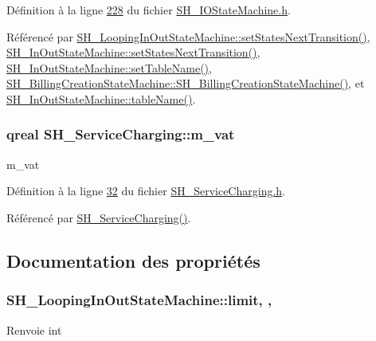 Définition à la ligne \hyperlink{SH__IOStateMachine_8h_source_l00228}{228} du fichier \hyperlink{SH__IOStateMachine_8h_source}{S\-H\-\_\-\-I\-O\-State\-Machine.\-h}.



Référencé par \hyperlink{classSH__LoopingInOutStateMachine_a0ee122553641721012f3710e71cce234}{S\-H\-\_\-\-Looping\-In\-Out\-State\-Machine\-::set\-States\-Next\-Transition()}, \hyperlink{classSH__InOutStateMachine_a70d6d81c0a8d4afd6aab0a7239edc237}{S\-H\-\_\-\-In\-Out\-State\-Machine\-::set\-States\-Next\-Transition()}, \hyperlink{classSH__InOutStateMachine_a95db31a7e7f31f36a8737adc739ab08c}{S\-H\-\_\-\-In\-Out\-State\-Machine\-::set\-Table\-Name()}, \hyperlink{classSH__BillingCreationStateMachine_ad62b77fa4aeafe200056ff3974562f83}{S\-H\-\_\-\-Billing\-Creation\-State\-Machine\-::\-S\-H\-\_\-\-Billing\-Creation\-State\-Machine()}, et \hyperlink{classSH__InOutStateMachine_a4288a6c86ddf83effefff886675591c9}{S\-H\-\_\-\-In\-Out\-State\-Machine\-::table\-Name()}.

\hypertarget{classSH__ServiceCharging_ae2fa75c56883dc4af6b0bbcbb86d0861}{
\subsubsection[{m\-\_\-vat}]{\setlength{\rightskip}{0pt plus 5cm}qreal S\-H\-\_\-\-Service\-Charging\-::m\-\_\-vat\hspace{0.3cm}{\ttfamily [private]}}}\label{classSH__ServiceCharging_ae2fa75c56883dc4af6b0bbcbb86d0861}


m\-\_\-vat 



Définition à la ligne \hyperlink{SH__ServiceCharging_8h_source_l00032}{32} du fichier \hyperlink{SH__ServiceCharging_8h_source}{S\-H\-\_\-\-Service\-Charging.\-h}.



Référencé par \hyperlink{classSH__ServiceCharging_afa5273d046049b1c2b020a6a19a8290b}{S\-H\-\_\-\-Service\-Charging()}.



\subsection{Documentation des propriétés}
\hypertarget{classSH__LoopingInOutStateMachine_a7b61682544bd06b52020df3e0d801d21}{
\subsubsection[{limit}]{\setlength{\rightskip}{0pt plus 5cm}S\-H\-\_\-\-Looping\-In\-Out\-State\-Machine\-::limit\hspace{0.3cm}{\ttfamily [read]}, {\ttfamily [write]}, {\ttfamily [inherited]}}}\label{classSH__LoopingInOutStateMachine_a7b61682544bd06b52020df3e0d801d21}
\begin{DoxyReturn}{Renvoie}
int 
\end{DoxyReturn}


